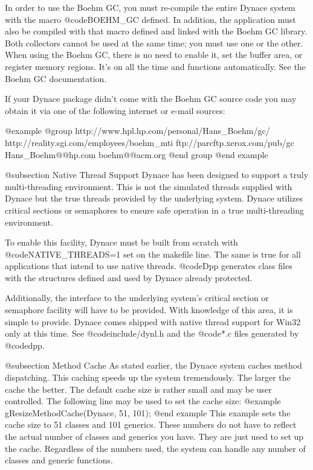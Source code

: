 In order to use the Boehm GC, you must re-compile the entire Dynace
system with the macro @code{BOEHM_GC} defined.  In addition, the
application must also be compiled with that macro defined and linked
with the Boehm GC library.  Both collectors cannot be used at the same
time; you must use one or the other.  When using the Boehm GC, there is no need to
enable it, set the buffer area, or register memory regions.  It's on all
the time and functions automatically.  See the Boehm GC documentation.

If your Dynace package didn't come with the Boehm GC source code you
may obtain it via one of the following internet or e-mail sources:

@example
@group
http://www.hpl.hp.com/personal/Hans_Boehm/gc/
http://reality.sgi.com/employees/boehm_mti
ftp://parcftp.xerox.com/pub/gc
Hans_Boehm@@hp.com
boehm@@acm.org
@end group
@end example



@subsection Native Thread Support
Dynace has been designed to support a truly multi-threading
environment.  This is not the simulated threads supplied with Dynace
but the true threads provided by the underlying system.  Dynace
utilizes critical sections or semaphores to ensure safe operation
in a true multi-threading environment.

To enable this facility, Dynace must be built from scratch with
@code{NATIVE_THREADS=1} set on the makefile line.  The same is
true for all applications that intend to use native threads.
@code{Dpp} generates class files with the structures defined
and used by Dynace already protected.

Additionally, the interface to the underlying system's critical
section or semaphore facility will have to be provided.  With
knowledge of this area, it is simple to provide.  Dynace comes
shipped with native thread support for Win32 only at this time.
See @code{include/dynl.h} and the @code{*.c} files generated by
@code{dpp}.



@subsection Method Cache
As stated earlier, the Dynace system caches method dispatching.  This
caching speeds up the system tremendously.  The larger the cache the
better.  The default cache size is rather small and may be user
controlled.  The following line may be used to set the cache size:
@example
        gResizeMethodCache(Dynace, 51, 101);
@end example
This example sets the cache size to 51 classes and 101 generics.  These
numbers do not have to reflect the actual number of classes and generics
you have.  They are just used to set up the cache.  Regardless of the
numbers used, the system can handle any number of classes and generic
functions.

